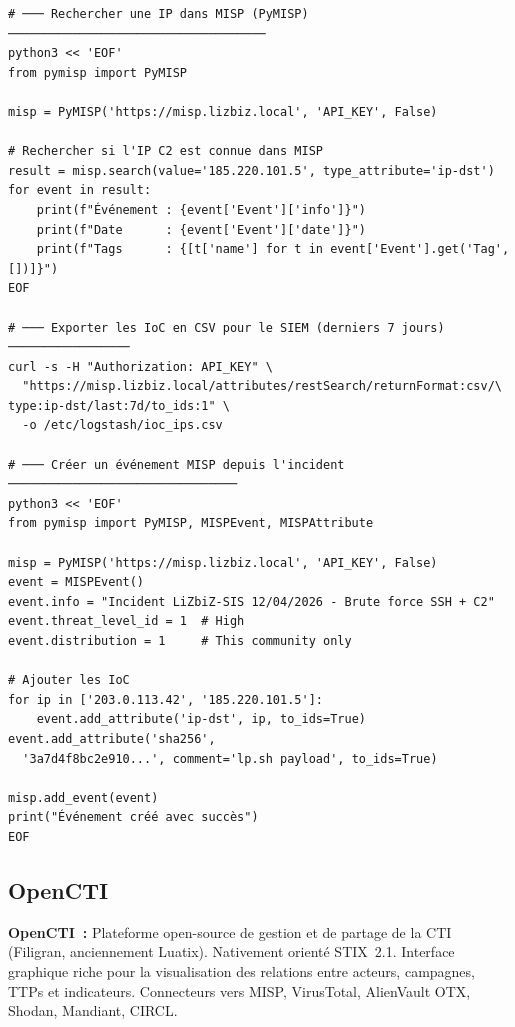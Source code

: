 \begin{lstlisting}[style=StyleTerminal,
  caption={MISP API --- recherche et export d'IoC},
  label={lst:misp-api}]
# ─── Rechercher une IP dans MISP (PyMISP) ────────────────────────────────────
python3 << 'EOF'
from pymisp import PyMISP

misp = PyMISP('https://misp.lizbiz.local', 'API_KEY', False)

# Rechercher si l'IP C2 est connue dans MISP
result = misp.search(value='185.220.101.5', type_attribute='ip-dst')
for event in result:
    print(f"Événement : {event['Event']['info']}")
    print(f"Date      : {event['Event']['date']}")
    print(f"Tags      : {[t['name'] for t in event['Event'].get('Tag', [])]}")
EOF

# ─── Exporter les IoC en CSV pour le SIEM (derniers 7 jours) ─────────────────
curl -s -H "Authorization: API_KEY" \
  "https://misp.lizbiz.local/attributes/restSearch/returnFormat:csv/\
type:ip-dst/last:7d/to_ids:1" \
  -o /etc/logstash/ioc_ips.csv

# ─── Créer un événement MISP depuis l'incident ────────────────────────────────
python3 << 'EOF'
from pymisp import PyMISP, MISPEvent, MISPAttribute

misp = PyMISP('https://misp.lizbiz.local', 'API_KEY', False)
event = MISPEvent()
event.info = "Incident LiZbiZ-SIS 12/04/2026 - Brute force SSH + C2"
event.threat_level_id = 1  # High
event.distribution = 1     # This community only

# Ajouter les IoC
for ip in ['203.0.113.42', '185.220.101.5']:
    event.add_attribute('ip-dst', ip, to_ids=True)
event.add_attribute('sha256',
  '3a7d4f8bc2e910...', comment='lp.sh payload', to_ids=True)

misp.add_event(event)
print("Événement créé avec succès")
EOF
\end{lstlisting}

\subsection{OpenCTI}

\begin{boxdef}
\textbf{OpenCTI~:} Plateforme open-source de gestion et de partage de
la CTI (Filigran, anciennement Luatix). Nativement orienté STIX~2.1.
Interface graphique riche pour la visualisation des relations entre
acteurs, campagnes, TTPs et indicateurs. Connecteurs vers MISP,
VirusTotal, AlienVault OTX, Shodan, Mandiant, CIRCL.
\end{boxdef}

